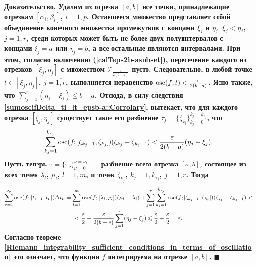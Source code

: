 \documentclass{report}
\newenvironment{Proof}{\par\noindent\bf Доказательство.\rm}{ $\blacksquare$\par}
\newcommand{\osc}{\mathop{\rm osc}\nolimits}
\begin{document}
\begin{Proof}
Удалим из отрезка $[a,b]$ все точки, принадлежащие отрезкам $[\alpha_i,\beta_i]$, $i=\overline{1,p}$. Оставшееся множество представляет собой объединение конечного множества промежутков с
концами $\xi_j$ и $\eta_j$, $\xi_j<\eta_j$, $j=\overline{1,r}$, среди которых может быть не более двух полуинтервалов с концами $\xi_j=a$ или $\eta_j=b$, а все остальные являются
интервалами. При этом, согласно включению (\ref{calTeps2b-asubset}), пересечение каждого из отрезков $[\xi_j,\eta_j]$ с множеством $\mathcal{T}_{\frac{\varepsilon}{2(b-a)}}$ пусто.
Следовательно, в любой точке $t\in[\xi_j,\eta_j]$, $j=\overline{1,r}$, выполняется неравенство $\osc(f;t)<\frac{\varepsilon}{2(b-a)}$. Ясно также, что $\sum\limits_{j=1}^r(\eta_j-\xi_j)
\leqslant b-a$. Отсюда, в силу следствия \ref{sumoscifDelta_ti_lt_epsb-a::Corrolary}, вытекает, что для каждого отрезка $[\xi_j,\eta_j]$ существует такое его разбиение $\tau_j=\{
\zeta_{k_j}\}_{k_j=0}^{k_j=k_{\tau_j}}$, что
\begin{gather*}
\sum\limits_{k_j=1}^{k_{\tau_j}}\osc(f;[\zeta_{k_j-1},\zeta_{k_j}])(\zeta_{k_j}-\zeta_{k_j-1})<\frac{\varepsilon}{2(b-a)}(\eta_j-\xi_j).
\end{gather*}
Пусть теперь $\tau=\{\tau_\nu\}_{\nu=0}^{\nu=\nu_\tau}$ --- разбиение всего отрезка $[a,b]$, состоящее из всех точек $\lambda_l$, $\mu_l$,
$l=\overline{1,m}$, и точек $\zeta_{k_j}$, $k_j=\overline{1,k_{\tau_j}}$, $j=\overline{1,r}$. Тогда
\begin{gather*}
\sum\limits_{\nu=1}^{\nu_\tau}\osc(f;[t_{\nu-1},t_\nu])\Delta t_\nu=\sum\limits_{l=1}^m\osc(f;[\lambda_l,\mu_l])(\mu_l-\lambda_l)+
\sum\limits_{j=1}^r\sum\limits_{k_j=1}^{k_{\tau_j}}\osc(f;[\zeta_{k_j-1},\zeta_{k_j}])(\zeta_{k_j}-\zeta_{k_j-1})<\\
<\frac\varepsilon2+\frac{\varepsilon}{2(b-a)}\sum\limits_{j=1}^r(\eta_j-\xi_j)\leqslant\frac\varepsilon2+\frac\varepsilon2=\varepsilon.
\end{gather*}
Согласно теореме \ref{Riemann_integrability_sufficient_conditions_in_terms_of_oscillation} это означает, что функция $f$ интегрируема на отрезке $[a,b]$.
\end{Proof}
\end{document}

